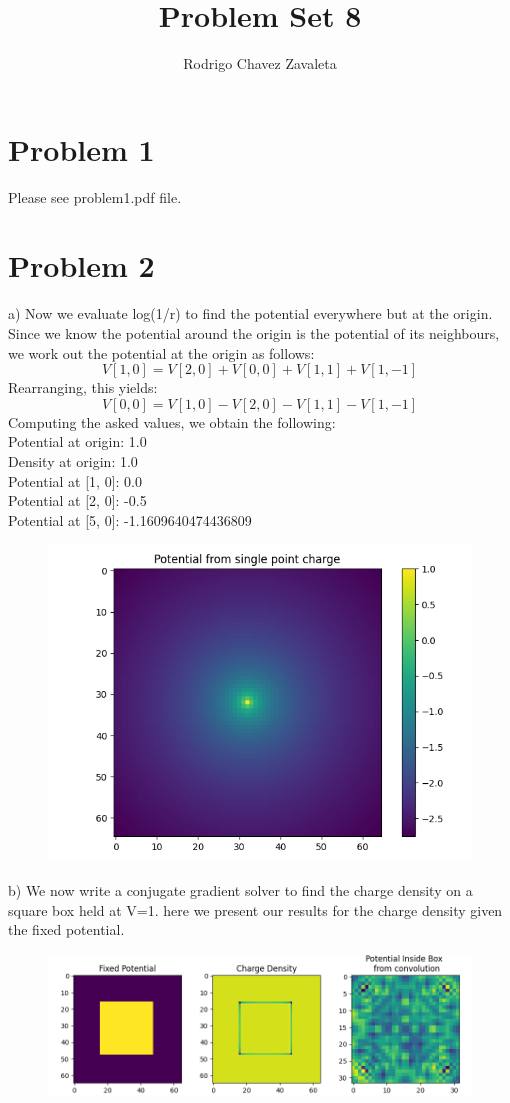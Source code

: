 \documentclass[]{article}
\title{Problem Set 8}
\author{Rodrigo Chavez Zavaleta}
\begin{document}
\maketitle

\section{Problem 1}
Please see problem1.pdf file.

\section{Problem 2}

a) Now we evaluate log(1/r) to find the potential everywhere but at the origin. Since we know the potential around the origin is the potential of its neighbours, we work out the potential at the origin as follows:
$$
	V[1,0] = V[2,0] + V[0,0] + V[1,1] + V[1,-1]
$$
Rearranging, this yields:
$$
	V[0,0] = V[1,0] - V[2,0] - V[1,1] - V[1,-1]
$$
Computing the asked values, we obtain the following:
\\
Potential at origin: 1.0\\
Density at origin: 1.0\\
Potential at [1, 0]: 0.0\\
Potential at [2, 0]: -0.5\\
Potential at [5, 0]: -1.1609640474436809\\

\begin{figure}[h!]
	\centering
	\includegraphics[width=0.5\linewidth]{../Results/2a1.png}
\end{figure}

\newpage
b) 
We now write a conjugate gradient solver to find the charge density on a square box held at V=1. here we present our results for the charge density given the fixed potential.

\begin{figure}[h!]
	\centering
	\includegraphics[width=0.75\linewidth]{../Results/2b1.png}
\end{figure}
\end{document}
